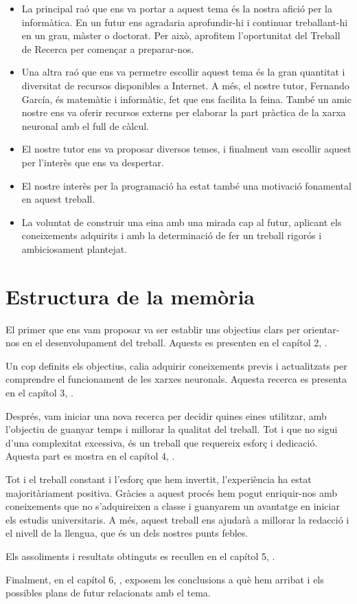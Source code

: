 \begin{itemize}
 \item La principal raó que ens va portar a aquest tema és la nostra afició per la informàtica. En un futur ens agradaria aprofundir-hi i continuar treballant-hi en un grau, màster o doctorat. Per això, aprofitem l’oportunitat del Treball de Recerca per començar a preparar-nos.

 \item Una altra raó que ens va permetre escollir aquest tema és la gran quantitat i diversitat de recursos disponibles a Internet. A més, el nostre tutor, Fernando García, és matemàtic i informàtic, fet que ens facilita la feina. També un amic nostre ens va oferir recursos externs per elaborar la part pràctica de la xarxa neuronal amb el full de càlcul.

 \item El nostre tutor ens va proposar diversos temes, i finalment vam escollir aquest per l’interès que ens va despertar.

 \item El nostre interès per la programació ha estat també una motivació fonamental en aquest treball.

 \item La voluntat de construir una eina amb una mirada cap al futur, aplicant els coneixements adquirits i amb la determinació de fer un treball rigorós i ambiciosament plantejat.
\end{itemize}

\section{Estructura de la memòria}
El primer que ens vam proposar va ser establir uns objectius clars per orientar-nos en el desenvolupament del treball. Aquests es presenten en el capítol 2, .

Un cop definits els objectius, calia adquirir coneixements previs i actualitzats per comprendre el funcionament de les xarxes neuronals. Aquesta recerca es presenta en el capítol 3, .

Després, vam iniciar una nova recerca per decidir quines eines utilitzar, amb l’objectiu de guanyar temps i millorar la qualitat del treball. Tot i que no sigui d’una complexitat excessiva, és un treball que requereix esforç i dedicació. Aquesta part es mostra en el capítol 4, .

Tot i el treball constant i l’esforç que hem invertit, l’experiència ha estat majoritàriament positiva. Gràcies a aquest procés hem pogut enriquir-nos amb coneixements que no s’adquireixen a classe i guanyarem un avantatge en iniciar els estudis universitaris. A més, aquest treball ens ajudarà a millorar la redacció i el nivell de la llengua, que és un dels nostres punts febles.

Els assoliments i resultats obtinguts es recullen en el capítol 5, .

Finalment, en el capítol 6, , exposem les conclusions a què hem arribat i els possibles plans de futur relacionats amb el tema.



